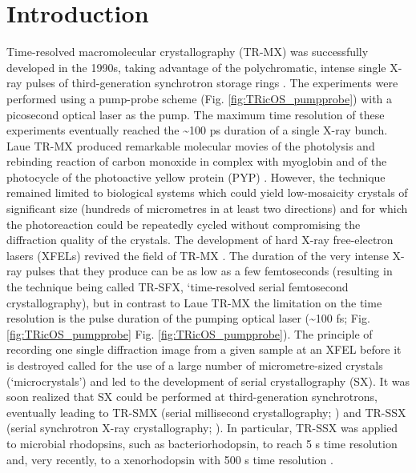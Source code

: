 \section{Introduction}
Time-resolved macromolecular crystallography (TR-MX) was successfully developed in the 1990s, taking advantage of the polychromatic, intense single X-ray pulses of third-generation synchrotron storage rings \parencite{moffatLaueDiffractionTimeresolved2019}. The experiments were performed using a pump-probe scheme (Fig. \ref{fig:TRicOS_pumpprobe}) with a picosecond optical laser as the pump. The maximum time resolution of these experiments eventually reached the \textasciitilde100 ps duration of a single X-ray bunch. Laue TR-MX produced remarkable molecular movies of the photolysis and rebinding reaction of carbon monoxide in complex with myoglobin \parencite{schotteWatchingProteinIt2003} and of the photocycle of the photoactive yellow protein (PYP) \parencite{jungVolumeconservingTransCis2013}. However, the technique remained limited to biological systems which could yield low-mosaicity crystals of significant size (hundreds of micrometres in at least two directions) and for which the photoreaction could be repeatedly cycled without compromising the diffraction quality of the crystals.
The development of hard X-ray free-electron lasers (XFELs) revived the field of TR-MX \parencite{brandenAdvancesChallengesTimeresolved2021}. The duration of the very intense X-ray pulses that they produce can be as low as a few femtoseconds (resulting in the technique being called TR-SFX, ‘time-resolved serial femtosecond crystallography), but in contrast to Laue TR-MX the limitation on the time resolution is the pulse duration of the pumping optical laser (\textasciitilde100 fs; Fig. \ref{fig:TRicOS_pumpprobe} Fig. \ref{fig:TRicOS_pumpprobe}). The principle of recording one single diffraction image from a given sample at an XFEL before it is destroyed called for the use of a large number of micrometre-sized crystals (‘microcrystals’) and led to the development of serial crystallography (SX). It was soon realized that SX could be performed at third-generation synchrotrons, eventually leading to TR-SMX (serial millisecond crystallography; \cite{noglyLipidicCubicPhase2015}) and TR-SSX (serial synchrotron X-ray crystallography; \parencite{diederichsSerialSynchrotronXRay2017}). In particular, TR-SSX was applied to microbial rhodopsins, such as bacteriorhodopsin, to reach 5 \textmu s time resolution \parencite{weinertProtonUptakeMechanism2019} and, very recently, to a xenorhodopsin with 500 \textmu s time resolution \parencite{kovalevMechanismsInwardTransmembrane2023}.
